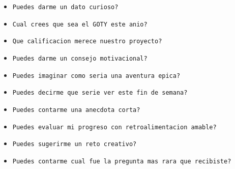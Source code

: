 \documentclass[a4paper,12pt]{article}
\begin{document}
\begin{itemize}
    \item \texttt{Puedes darme un dato curioso?}
    \item \texttt{Cual crees que sea el GOTY este anio?}
    \item \texttt{Que calificacion merece nuestro proyecto?}
    \item \texttt{Puedes darme un consejo motivacional?}
    \item \texttt{Puedes imaginar como seria una aventura epica?}
    \item \texttt{Puedes decirme que serie ver este fin de semana?}
    \item \texttt{Puedes contarme una anecdota corta?}
    \item \texttt{Puedes evaluar mi progreso con retroalimentacion amable?}
    \item \texttt{Puedes sugerirme un reto creativo?}
    \item \texttt{Puedes contarme cual fue la pregunta mas rara que recibiste?}
\end{itemize}
\end{document}

